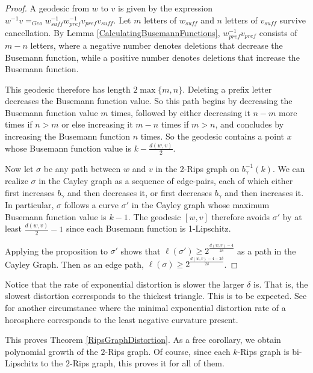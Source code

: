\documentclass[10pt,a4paper]{amsart}
\theoremstyle{definition}
\theoremstyle{remark}
\begin{document}
	\begin{proof}
		
		A geodesic from $w$ to $v$ is given by the expression $w^{-1}v =_{Geo} w_{suff}^{-1}w_{pref}^{-1}v_{pref}v_{suff}$. Let $m$ letters of $w_{suff}$ and $n$ letters of $v_{suff}$ survive cancellation. By Lemma \ref{CalculatingBusemannFunctions}, $w_{pref}^{-1}v_{pref}$ consists of $m-n$ letters, where a negative number denotes deletions that decrease the Busemann function, while a positive number denotes deletions that increase the Busemann function.
		
		This geodesic therefore has length $2\max\{m, n\}$. Deleting a prefix letter decreases the Busemann function value. So this path begins by decreasing the Busemann function value $m$ times, followed by either decreasing it $n-m$ more times if $n>m$ or else increasing it $m-n$ times if $m>n$, and concludes by increasing the Busemann function $n$ times. So the geodesic contains a point $x$ whose Busemann function value is $k-\frac{d(w, v)}{2}$.
		
		Now let $\sigma$ be any path between $w$ and $v$ in the 2-Rips graph on $b_{\gamma}^{-1}(k)$. We can realize $\sigma$ in the Cayley graph as a sequence of edge-pairs, each of which either first increases $b_\gamma$ and then decreases it, or first decreases $b_\gamma$ and then increases it. In particular, $\sigma$ follows a curve $\sigma'$ in the Cayley graph whose maximum Busemann function value is $k-1$. The geodesic $[w,v]$ therefore avoids $\sigma'$ by at least $\frac{d(w, v)}{2}-1$ since each Busemann function is 1-Lipschitz.
		
		Applying the proposition to $\sigma'$ shows that $\ell(\sigma')\ge 2^{\frac{d(w, v)-4}{2\delta}}$ as a path in the Cayley Graph. Then as an edge path, $\ell(\sigma)\ge 2^{\frac{d(w, v)-4-2\delta}{2\delta}}$.
	\end{proof}
	
	Notice that the rate of exponential distortion is slower the larger $\delta$ is. That is, the slowest distortion corresponds to the thickest triangle. This is to be expected. See \cite{HeinzeImHof} for another circumstance where the minimal exponential distortion rate of a horosphere corresponds to the least negative curvature present.
	
	This proves Theorem \ref{RipsGraphDistortion}. As a free corollary, we obtain polynomial growth of the $2$-Rips graph. Of course, since each $k$-Rips graph is bi-Lipschitz to the $2$-Rips graph, this proves it for all of them.
	
\end{document}
